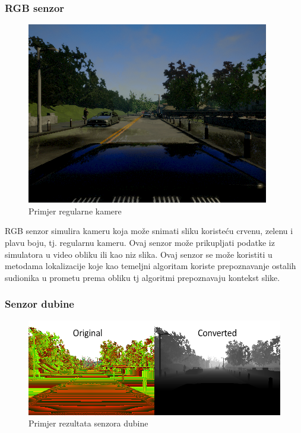 \subsubsection{RGB senzor}
\begin{figure}[ht!]
  \centering
  \includegraphics[scale=0.5]{images/rgb_example.png}
  \caption{Primjer regularne kamere}
  \label{fig:rgb_exmaple}
\end{figure}

RGB senzor simulira kameru koja može snimati sliku koristeću crvenu, zelenu i plavu boju, tj. regularnu kameru. Ovaj senzor može prikupljati podatke iz simulatora u video obliku ili kao niz slika. Ovaj senzor se može koristiti u metodama lokalizacije koje kao temeljni algoritam koriste prepoznavanje ostalih sudionika u prometu prema obliku tj algoritmi prepoznavaju kontekst slike.

\subsubsection{Senzor dubine}
\begin{figure}[ht!]
  \centering
  \includegraphics[scale=0.5]{images/depth_example.png}
  \caption{Primjer rezultata senzora dubine}
  \label{fig:depth_exmaple}
\end{figure}

